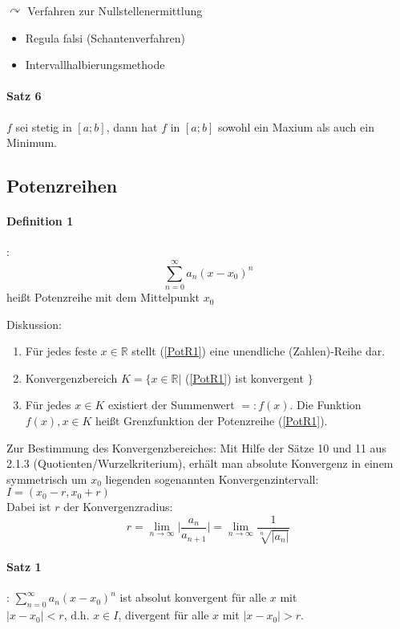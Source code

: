 \documentclass[a4paper]{scrartcl}
\begin{document}
$\curvearrowright$ Verfahren zur Nullstellenermittlung
\begin{itemize}
\item Regula falsi (Schantenverfahren)
\item Intervallhalbierungsmethode
\end{itemize}

\paragraph{Satz 6} $f$ sei stetig in $[a;b]$, dann hat $f$ in $[a;b]$ sowohl ein Maxium als auch ein Minimum.

\subsection{Potenzreihen}
\paragraph{Definition 1}: 
\begin{equation}\label{PotR1} \sum\limits_{n=0}^{\infty} a_n (x - x_0)^n \end{equation}
heißt Potenzreihe mit dem Mittelpunkt $x_0$

Diskussion:
\begin{enumerate}
\item Für jedes feste $x \in \mathbb{R}$ stellt (\ref{PotR1}) eine unendliche (Zahlen)-Reihe dar.
\item Konvergenzbereich $K=\{x\in \mathbb{R} |$ (\ref{PotR1}) ist konvergent $\}$
\item Für jedes $x \in K$ existiert der Summenwert $=: f(x)$. Die Funktion $f(x),x\in K$ heißt Grenzfunktion der Potenzreihe (\ref{PotR1}).
\end{enumerate}

Zur Bestimmung des Konvergenzbereiches: Mit Hilfe der Sätze 10 und 11 aus 2.1.3 (Quotienten/Wurzelkriterium), erhält man absolute Konvergenz in einem symmetrisch um $x_0$ liegenden sogenannten Konvergenzintervall: $I=(x_0 -r, x_0 +r)$\\

Dabei ist $r$ der Konvergenzradius:\\
\begin{equation} \label{PotR2}
r = \lim\limits_{n \to \infty} \lvert \frac{a_n}{a_{n+1}} \rvert = \lim\limits_{n \to \infty} \frac{1}{\sqrt[n]{\lvert a_n \rvert}} \end{equation}

\paragraph{Satz 1}: $\sum\limits_{n=0}^{\infty} a_n (x-x_0)^n$ ist absolut konvergent für alle $x$ mit $\lvert x - x_0 \rvert < r \text{, d.h. } x \in I$, divergent für alle $x$ mit $\lvert x - x_0 \rvert > r$. 
\end{document}
